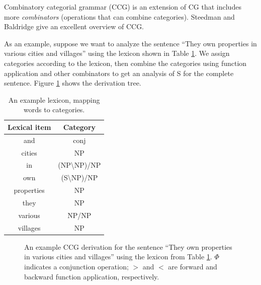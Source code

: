 \documentclass[a4paper]{article}
\begin{document}
Combinatory categorial grammar (CCG) is an extension of CG that includes more {\em combinators} (operations that can combine categories). Steedman and Baldridge  give an excellent overview of CCG.

As an example, suppose we want to analyze the sentence ``They own properties in various cities and villages'' using the lexicon shown in Table \ref{table:lexicon}. We assign categories according to the lexicon, then combine the categories using function application and other combinators to get an analysis of S for the complete sentence. Figure \ref{fig:ccg-derivation} shows the derivation tree.

\begin{table}
\centering
\begin{tabular}{|c|c|}
\hline
Lexical item & Category \\
\hline
and & conj \\
cities & NP \\
in &  (NP\textbackslash NP)/NP \\
own & (S\textbackslash NP)/NP \\
properties & NP \\
they & NP \\
various & NP/NP \\
villages & NP \\
\hline
\end{tabular}
\caption{An example lexicon, mapping words to categories.\label{table:lexicon}}
\end{table}

\begin{figure}
\centering
{}
\caption{An example CCG derivation for the sentence ``They own properties in various cities and villages'' using the lexicon from Table \ref{table:lexicon}. $\Phi$ indicates a conjunction operation; $>$ and $<$ are forward and backward function application, respectively.\label{fig:ccg-derivation}}
\end{figure}
\end{document}
